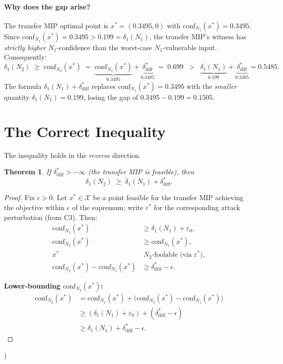 \documentclass[12pt]{article}
\theoremstyle{definition}
\theoremstyle{plain}
\newtheorem{theorem}{Theorem}[section]
\theoremstyle{remark}
\newcommand{\conf}[2]{\mathrm{conf}_{#1}(#2)}
\newcommand{\dN}[1]{\delta_1(N_{#1})}
\newcommand{\ddiff}{\delta_{\mathrm{diff}}^{*}}
\newcommand{\Xdom}{\mathcal{X}}
\begin{document}
\paragraph{Why does the gap arise?}
The transfer MIP optimal point is $x^*=(0.3495,0)$ with
$\conf{N_1}{x^*}=0.3495$.
Since $\conf{N_1}{x^*}=0.3495 > 0.199=\dN{1}$, the transfer MIP's witness
has \emph{strictly higher} $N_1$-confidence than the worst-case $N_1$-vulnerable input.
Consequently:
\[
  \dN{2}
  \;\geq\; \conf{N_2}{x^*}
  \;=\; \underbrace{\conf{N_1}{x^*}}_{0.3495}
        + \underbrace{\ddiff}_{0.3495}
  \;=\; 0.699
  \;\;>\;\;
  \underbrace{\dN{1}}_{0.199}+\underbrace{\ddiff}_{0.3495}=0.5485.
\]
The formula $\dN{1}+\ddiff$ replaces $\conf{N_1}{x^*)=0.3495$ with the
\emph{smaller} quantity $\dN{1}=0.199$, losing the gap of
$0.3495-0.199=0.1505$.

\section{The Correct Inequality}

The inequality holds in the \emph{reverse} direction.

\begin{theorem}\label{thm:correct}
If $\ddiff>-\infty$ (the transfer MIP is feasible), then
\[
  \boxed{\dN{2} \;\geq\; \dN{1} + \ddiff.}
\]
\end{theorem}

\begin{proof}
Fix $\epsilon>0$.
Let $x^*\in\Xdom$ be a point feasible for the transfer MIP achieving the
objective within $\epsilon$ of the supremum; write $\varepsilon^*$ for the
corresponding attack perturbation (from C3). Then:
\begin{align}
  \conf{N_1}{x^*} &\geq \dN{1}+\varepsilon_0, \tag{C1}\\
  \conf{N_2}{x^*} &\geq \conf{N_1}{x^*}, \tag{C2}\\
  x^* &\ N_2\text{-foolable (via }\varepsilon^*\text{)}, \tag{C3}\\
  \conf{N_2}{x^*}-\conf{N_1}{x^*} &\geq \ddiff-\epsilon. \tag{obj}
\end{align}

\noindent\textbf{Lower-bounding $\conf{N_2}{x^*}$:}
\begin{align*}
  \conf{N_2}{x^*}
  &= \conf{N_1}{x^*}
     + \bigl(\conf{N_2}{x^*}-\conf{N_1}{x^*}\bigr)\\
  &\geq (\dN{1}+\varepsilon_0)+(\ddiff-\epsilon)
  \tag{by C1 and (obj)}\\
  &\geq \dN{1}+\ddiff-\epsilon.
\end{align*}


\end{proof}}
\end{document}
